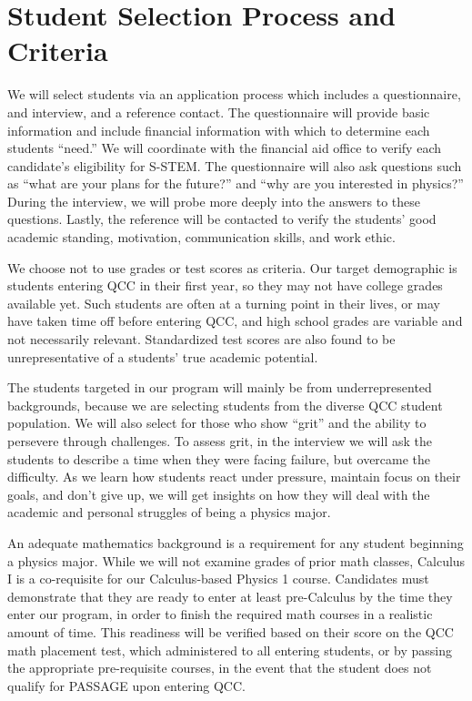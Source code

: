 \documentclass[12pt]{article}
\newcommand\new[1]{{\color{blue}#1}}
\begin{document}
\vspace{-5mm}

\section{Student Selection Process and Criteria}
\vspace{-3mm}

We will select students via an application process which includes a questionnaire, and interview, and a reference contact.  The questionnaire will provide basic information and include financial information with which to determine each students ``need.''  We will coordinate with the financial aid office to verify each candidate's eligibility for S-STEM.  The questionnaire will also ask questions such as ``what are your plans for the future?'' and ``why are you interested in physics?''  During the interview, we will probe more deeply into the answers to these questions.  Lastly, the reference will be contacted to verify the students' good academic standing, motivation, communication skills, and work ethic.

We choose not to use grades or test scores as criteria.  Our target demographic is students entering QCC in their first year, so they may not have college grades available yet.  Such students are often at a turning point in their lives, or may have taken time off before entering QCC, and high school grades are variable and not necessarily relevant.  Standardized test scores are also found to be unrepresentative of a students' true academic potential.

The students targeted in our program will mainly be from underrepresented backgrounds, because we are selecting students from the diverse QCC  student population.  We will also select for those who show ``grit'' and the ability to persevere through challenges.  \new{ To assess grit, in the interview we will ask the students to describe a time when they were facing failure, but overcame the difficulty.  As we learn how students react under pressure, maintain focus on their goals, and don't give up, we will get insights on how they will deal with the academic and personal struggles of being a physics major.  }

An adequate mathematics background is a requirement for any student beginning a physics major.  While we will not examine grades of prior math classes, Calculus I is a co-requisite for our Calculus-based Physics 1 course.  Candidates must demonstrate that they are ready to enter at least pre-Calculus by the time they enter our program, in order to finish the required math courses in a realistic amount of time.  This readiness will be verified based on their score on the QCC math placement test, which administered to all entering students, or by passing the appropriate pre-requisite courses, in the event that the student does not qualify for PASSAGE upon entering QCC. 
\end{document}
